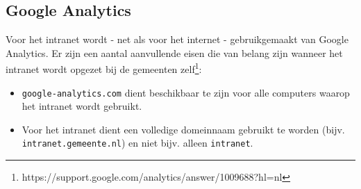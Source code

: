\subsection{Google Analytics}\label{analyticsintranet}

Voor het intranet wordt - net als voor het internet - gebruikgemaakt van Google Analytics. Er zijn een aantal aanvullende eisen die van belang zijn wanneer het intranet wordt opgezet bij de gemeenten zelf\footnote{https://support.google.com/analytics/answer/1009688?hl=nl}:
\begin{itemize}
\item \texttt{google-analytics.com} dient beschikbaar te zijn voor alle computers waarop het intranet wordt gebruikt.
\item Voor het intranet dient een volledige domeinnaam gebruikt te worden (bijv. \texttt{intranet.gemeente.nl}) en niet bijv. alleen \texttt{intranet}.
\end{itemize}